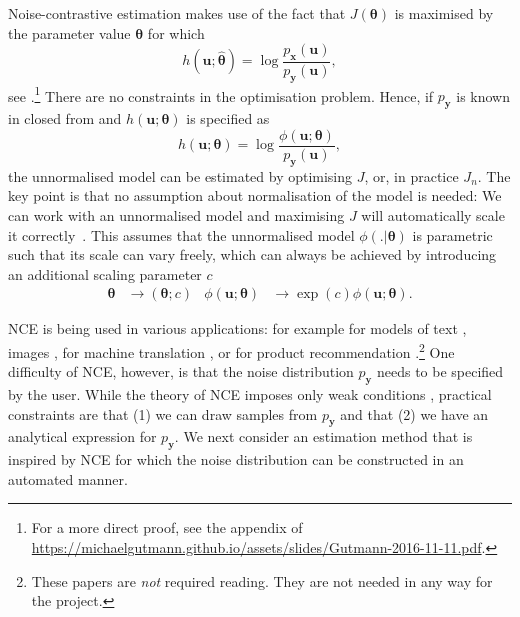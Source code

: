 \documentclass[11pt, oneside]{article}
\newcommand{\thetab}{{\boldsymbol{\theta}}}
\newcommand{\thetaHat}{{\hat{\thetab}}}
\newcommand{\pnn}{\phi}
\newcommand{\pdata}{p_{ \mathbf x}}
\newcommand{\pnoise}{p_{ \mathbf y}}
\renewcommand{\u}{{\mathbf u}}
\begin{document}
Noise-contrastive estimation makes use of the fact that $J(\thetab)$ is
maximised by the parameter value $\thetab$ for which
\begin{equation}
  h(\u;\thetaHat) = \log \frac{\pdata(\u)}{\pnoise(\u)},
\end{equation}
see \citep{Gutmann2012a}.\footnote{For a more direct proof, see the appendix of \url{https://michaelgutmann.github.io/assets/slides/Gutmann-2016-11-11.pdf}.}
There are no constraints in the optimisation problem. Hence, if $\pnoise$ is known in closed from and
$h(\u;\thetab)$ is specified as
\begin{equation}
  h(\u;\thetab) = \log \frac{\pnn(\u;\thetab)}{\pnoise(\u)},
  \label{eq:Gdef}
\end{equation}
the unnormalised model can be estimated by optimising $J$, or, in
practice $J_n$. The key point is that no assumption about
normalisation of the model is needed: We can work with an unnormalised
model and maximising $J$ will automatically scale it
correctly~\citep{Gutmann2012a}. This assumes that the unnormalised
model $\pnn(.|\thetab)$ is parametric such that its scale can vary
freely, which can always be achieved by introducing an additional
scaling parameter $c$
\begin{align}
  \thetab &\rightarrow (\thetab;c)&   \pnn(\u;\thetab) &\rightarrow \exp(c)\pnn(\u;\thetab).
\end{align}

NCE is being used in various applications: for example for models of
text \citep{Mnih2012}, images \citep{Gutmann2013}, for machine
translation \citep{Zoph2016}, or for product recommendation
\citep{Tschiatschek2016}.\footnote{These papers are \emph{not}
  required reading. They are not needed in any way for the project.} One difficulty
of NCE, however, is that the noise distribution $\pnoise$ needs to be
specified by the user. While the theory of NCE imposes only weak
conditions \citep[Section 2.4]{Gutmann2012a}, practical constraints
are that (1) we can draw samples from $\pnoise$ and that (2) we have
an analytical expression for $\pnoise$. We next consider an estimation
method that is inspired by NCE for which the noise distribution can be
constructed in an automated manner.
\end{document}
